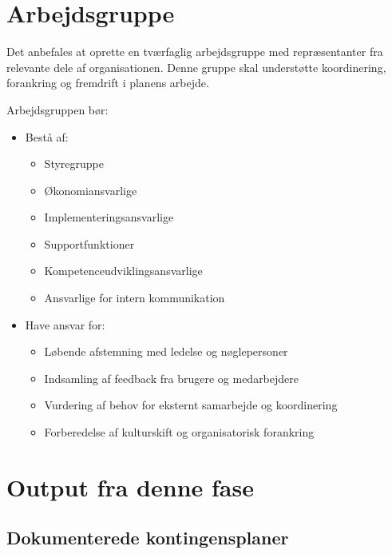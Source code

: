 \documentclass[a4paper,11pt]{book}
\begin{document}
\section{Arbejdsgruppe}\label{arbejdsgruppe}

Det anbefales at oprette en tværfaglig arbejdsgruppe med repræsentanter
fra relevante dele af organisationen. Denne gruppe skal understøtte
koordinering, forankring og fremdrift i planens arbejde.

Arbejdsgruppen bør:

\begin{itemize}
\item
  Bestå af:

  \begin{itemize}
  \tightlist
  \item
    Styregruppe
  \item
    Økonomiansvarlige
  \item
    Implementeringsansvarlige
  \item
    Supportfunktioner
  \item
    Kompetenceudviklingsansvarlige
  \item
    Ansvarlige for intern kommunikation
  \end{itemize}
\item
  Have ansvar for:

  \begin{itemize}
  \tightlist
  \item
    Løbende afstemning med ledelse og nøglepersoner
  \item
    Indsamling af feedback fra brugere og medarbejdere
  \item
    Vurdering af behov for eksternt samarbejde og koordinering
  \item
    Forberedelse af kulturskift og organisatorisk forankring
  \end{itemize}
\end{itemize}

\section{Output fra denne fase}\label{output-fra-denne-fase}

\subsection{Dokumenterede
kontingensplaner}\label{dokumenterede-kontingensplaner}
\end{document}
